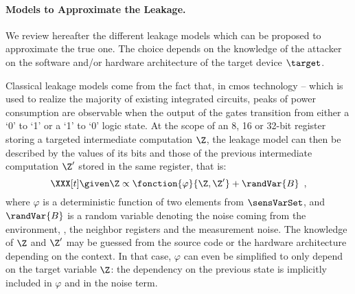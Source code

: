 \paragraph{Models to Approximate the Leakage.}
We review hereafter the different leakage models which can be proposed to approximate the true one.
The choice depends on the knowledge of the attacker on the software and/or hardware architecture of the target device \(\target\).

Classical leakage models come from the fact that, in \gls{cmos} technology -- which is used to realize the majority of existing integrated circuits, peaks of power consumption are observable when the output of the gates transition from either a `0' to `1' or a `1' to `0' logic state.
At the scope of an 8, 16 or 32-bit register storing a targeted intermediate computation \(\Z\), the leakage model can then be described by the values of its bits and those of the previous intermediate computation \(\Z'\) stored in the same register, that is:
\begin{equation}
    \XXX[t] \given \Z \propto \fonction{\varphi}{\Z, \Z'} + \randVar{B} \enspace ,
\end{equation}
where \(\varphi\) is a deterministic function of two elements from \(\sensVarSet\), and \(\randVar{B}\) is a random variable denoting the noise coming from the environment, \ie{}, the neighbor registers and the measurement noise.
The knowledge of \(\Z\) and \(\Z'\) may be guessed from the source code or the hardware architecture depending on the context.
In that case, \(\varphi\) can even be simplified to only depend on the target variable \(\Z\): the dependency on the previous state is implicitly included in \(\varphi\) and in the noise term.

